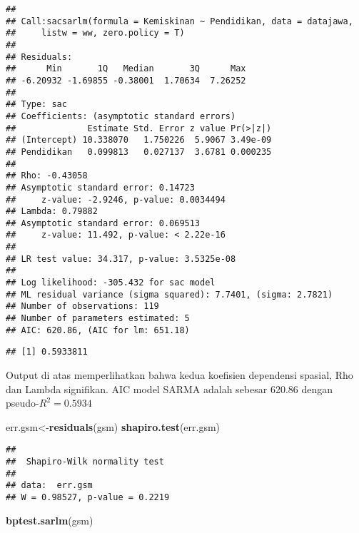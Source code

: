 \documentclass[
]{book}
\newenvironment{Shaded}{\begin{snugshade}}{\end{snugshade}}
\newcommand{\DecValTok}[1]{\textcolor[rgb]{0.00,0.00,0.81}{#1}}
\newcommand{\KeywordTok}[1]{\textcolor[rgb]{0.13,0.29,0.53}{\textbf{#1}}}
\newcommand{\NormalTok}[1]{#1}
\newcommand{\OperatorTok}[1]{\textcolor[rgb]{0.81,0.36,0.00}{\textbf{#1}}}
\begin{document}
\begin{verbatim}
## 
## Call:sacsarlm(formula = Kemiskinan ~ Pendidikan, data = datajawa, 
##     listw = ww, zero.policy = T)
## 
## Residuals:
##      Min       1Q   Median       3Q      Max 
## -6.20932 -1.69855 -0.38001  1.70634  7.26252 
## 
## Type: sac 
## Coefficients: (asymptotic standard errors) 
##              Estimate Std. Error z value Pr(>|z|)
## (Intercept) 10.338070   1.750226  5.9067 3.49e-09
## Pendidikan   0.099813   0.027137  3.6781 0.000235
## 
## Rho: -0.43058
## Asymptotic standard error: 0.14723
##     z-value: -2.9246, p-value: 0.0034494
## Lambda: 0.79882
## Asymptotic standard error: 0.069513
##     z-value: 11.492, p-value: < 2.22e-16
## 
## LR test value: 34.317, p-value: 3.5325e-08
## 
## Log likelihood: -305.432 for sac model
## ML residual variance (sigma squared): 7.7401, (sigma: 2.7821)
## Number of observations: 119 
## Number of parameters estimated: 5 
## AIC: 620.86, (AIC for lm: 651.18)
\end{verbatim}

\begin{Shaded}
\end{Shaded}

\begin{verbatim}
## [1] 0.5933811
\end{verbatim}

Output di atas memperlihatkan bahwa kedua koefisien dependensi spasial, Rho dan Lambda signifikan. AIC model SARMA adalah sebesar 620.86 dengan pseudo-\(R^2=0.5934\)

\begin{Shaded}
\begin{Highlighting}[]
\NormalTok{err.gsm\textless{}{-}}\KeywordTok{residuals}\NormalTok{(gsm)}
\KeywordTok{shapiro.test}\NormalTok{(err.gsm)}
\end{Highlighting}
\end{Shaded}

\begin{verbatim}
## 
##  Shapiro-Wilk normality test
## 
## data:  err.gsm
## W = 0.98527, p-value = 0.2219
\end{verbatim}

\begin{Shaded}
\begin{Highlighting}[]
\KeywordTok{bptest.sarlm}\NormalTok{(gsm)}
\end{Highlighting}
\end{Shaded}
\end{document}
